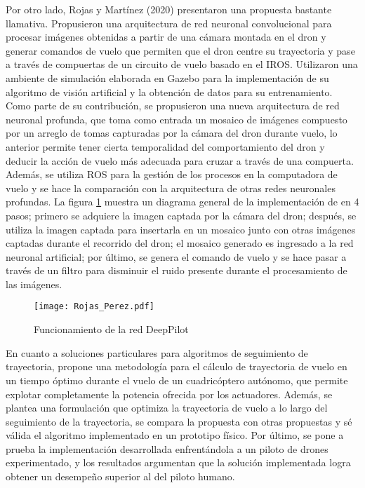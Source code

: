 Por otro lado, Rojas y Martínez (2020)\citet{rojas2020deeppilot} presentaron una propuesta bastante llamativa. Propusieron una arquitectura de red neuronal convolucional para procesar imágenes obtenidas a partir de una cámara montada en el dron y generar comandos de vuelo que permiten que el dron centre su trayectoria y pase a través de compuertas de un circuito de vuelo basado en el IROS. Utilizaron una ambiente de simulación elaborada en Gazebo para la implementación de su algoritmo de visión artificial y la obtención de datos para su entrenamiento. Como parte de su contribución, se propusieron una nueva arquitectura de red neuronal profunda, que toma como entrada un mosaico de imágenes compuesto por un arreglo de tomas capturadas por la cámara del dron durante vuelo, lo anterior permite tener cierta temporalidad del comportamiento del dron y deducir la acción de vuelo más adecuada para cruzar a través de una compuerta.
Además, se utiliza ROS para la gestión de los procesos en la computadora de vuelo y se hace la comparación con la arquitectura de otras redes neuronales profundas. La figura \ref{fig:Rojas_Perez} muestra un diagrama general de la implementación de \citet{rojas2020deeppilot} en 4 pasos; primero se adquiere la imagen captada por la cámara del dron; después, se utiliza la imagen captada para insertarla en un mosaico junto con otras imágenes captadas durante el recorrido del dron; el mosaico generado es ingresado a la red neuronal artificial; por último, se genera el comando de vuelo y se hace pasar a través de un filtro para disminuir el ruido presente durante el procesamiento de las imágenes.

\begin{figure}[ht]
    \centering
    \texttt{[image: Rojas\_Perez.pdf]}
    \caption{Funcionamiento de la red DeepPilot\citet{rojas2020deeppilot}}
    \label{fig:Rojas_Perez}
\end{figure}

En cuanto a soluciones particulares para algoritmos de seguimiento de trayectoria, \citet{foehn2021time} propone una metodología para el cálculo de trayectoria de vuelo en un tiempo óptimo durante el vuelo de un cuadricóptero autónomo, que permite explotar completamente la potencia ofrecida por los actuadores. Además, se plantea una formulación que optimiza la trayectoria de vuelo a lo largo del seguimiento de la trayectoria, se compara la propuesta con otras propuestas y sé válida el algoritmo implementado en un prototipo físico. Por último, se pone a prueba la implementación desarrollada enfrentándola a un piloto de drones experimentado, y los resultados argumentan que la solución implementada logra obtener un desempeño superior al del piloto humano.

